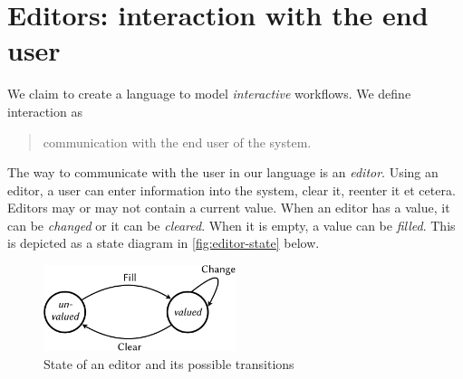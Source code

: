
\section{Editors: interaction with the end user}

We claim to create a language to model \emph{interactive} workflows.
We define interaction as
\begin{quote}
  communication with the end user of the system.
\end{quote}
The way to communicate with the user in our language is an \emph{editor}.
Using an editor,
a user can enter information into the system,
clear it, reenter it et cetera.
Editors may or may not contain a current value.
When an editor has a value, it can be \emph{changed} or it can be \emph{cleared}.
When it is empty, a value can be \emph{filled}.
This is depicted as a state diagram in \autoref{fig:editor-state} below.

\begin{figure}
  \centering
  \includegraphics[width=0.5\textwidth]{figures/editor-state-crop.pdf}
  \caption{State of an editor and its possible transitions}
  \label{fig:editor-state}
\end{figure}

